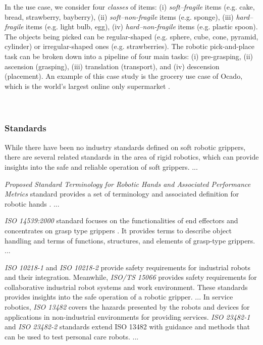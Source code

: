 \documentclass[lettersize,journal]{IEEEtran}
\begin{document}
In the use case, we consider four \emph{classes} of items: (i) \emph{soft–fragile} items (e.g. cake, bread, strawberry, bayberry), (ii) \emph{soft–non-fragile} items (e.g. sponge), (iii) \emph{hard–fragile} items (e.g. light bulb, egg), (iv) \emph{hard–non-fragile} items (e.g. plastic spoon). 
The objects being picked can be regular-shaped (e.g. sphere, cube, cone, pyramid, cylinder) or irregular-shaped ones (e.g. strawberries).
The robotic pick-and-place task can be broken down into a pipeline of four main tasks: (i) pre-grasping, (ii) ascension (grasping), (iii) translation (transport), and (iv) descension (placement). 
An example of this case study is the grocery use case of Ocado, which is the world's largest online only supermarket \cite{Triantafyllou2019, Sotiropoulos2018}. \\\\\\

\subsubsection{Standards}
While there have been no industry standards defined on soft robotic grippers, there are several related standards in the area of rigid robotics, which can provide insights into the safe and reliable operation of soft grippers. ...

\emph{Proposed Standard Terminology for Robotic Hands and Associated Performance Metrics} standard provides a set of terminology and associated definition for robotic hands \cite{Falco2018}. ...

\emph{ISO 14539:2000}  standard focuses on the functionalities of end effectors and concentrates on grasp type grippers \cite{ISO14539:2000}. It provides terms to describe object handling and terms of functions, structures, and elements of grasp-type grippers. ...


\emph{ISO 10218-1} and \emph{ISO 10218-2} provide safety requirements for industrial robots and their integration.
Meanwhile, \emph{ISO/TS 15066} provides safety requirements for collaborative industrial robot systems and work environment. 
These standards provides insights into the safe operation of a robotic gripper. ...
In service robotics, \emph{ISO 13482 }covers the hazards presented by the robots and devices for applications in non-industrial environments for providing services. \emph{ISO 23482-1} and \emph{ISO 23482-2} standards extend ISO 13482 with guidance and methods that can be used to test personal care robots. ...
\end{document}
